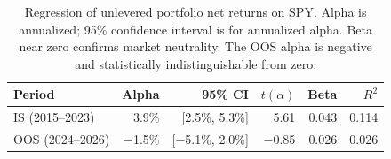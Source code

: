 \begin{table}[htbp]
    \centering
    \small
    \begin{tabular}{lrrrrr}
        \toprule
        Period & Alpha & 95\% CI & $t(\alpha)$ & Beta & $R^2$ \\
        \midrule
        IS (2015--2023)  & 3.9\% & [2.5\%, 5.3\%] &  5.61 & 0.043 & 0.114 \\
        OOS (2024--2026) & $-$1.5\% & [$-$5.1\%, 2.0\%] & $-$0.85 & 0.026 & 0.026 \\
        \bottomrule
    \end{tabular}
    \caption{Regression of unlevered portfolio net returns on SPY. Alpha is annualized;
    95\% confidence interval is for annualized alpha. Beta near zero confirms
    market neutrality. The OOS alpha is negative and statistically indistinguishable
    from zero.}
    \label{tab:portfolio-regression}
\end{table}
